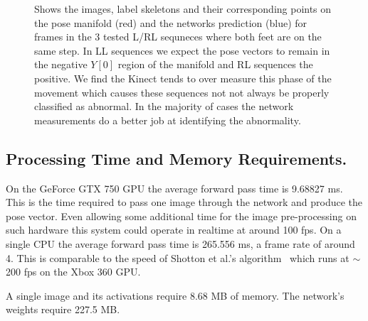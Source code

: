 \documentclass[11pt]{article} %
\begin{document}
\begin{figure}
\qquad%
\caption{Shows the images, label skeletons and their corresponding points on the pose manifold (red) and the networks prediction (blue) for frames in the 3 tested L/RL sequneces where both feet are on the same step. In LL sequences we expect the pose vectors to remain in the negative $Y[0]$ region of the manifold and RL sequences the positive. We find the Kinect tends to over measure this phase of the movement which causes these sequences not not always be properly classified as abnormal. In the majority of cases the network measurements do a better job at identifying the abnormality. }
\label{fig:lrlOverMeasure}
\end{figure}


\subsection{Processing Time and Memory Requirements.}

On the GeForce GTX 750 GPU the average forward pass time is 9.68827 ms. This is the time required to pass one image through the network and produce the pose vector. Even allowing some additional time for the image pre-processing on such hardware this system could operate in realtime at around 100 fps. On a single CPU the average forward pass time is 265.556 ms, a frame rate of around 4. This is comparable to the speed of Shotton et al.'s algorithm~\cite{Shotton2011} which runs at $\sim$200 fps on the Xbox 360 GPU.

 A single image and its activations require 8.68 MB of memory. The network's weights require 227.5 MB. 
\end{document}
